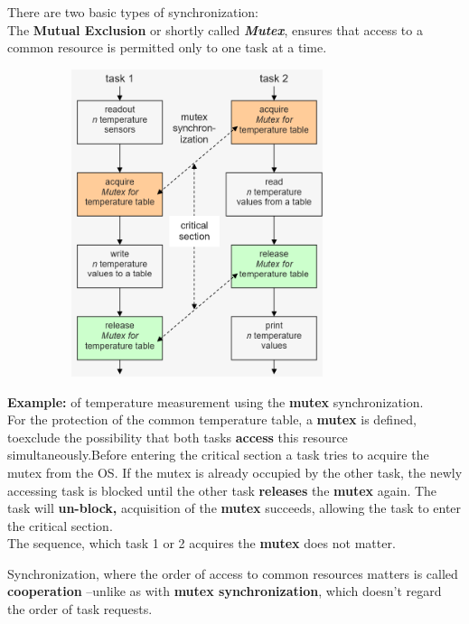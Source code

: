 \newpage  
There are two basic types of synchronization:\\

The \textbf{Mutual Exclusion }or shortly called \textbf{\textit{Mutex}}, ensures that access to a common resource is permitted only to one task at a time. 

 	\begin{figure}[h]
    \centering
    \includegraphics[width=9cm, height=9cm]{Images/image103.png}
    \label{fig:Fig }
    \end{figure}

\textbf{Example:} of temperature measurement using the \textbf{mutex} synchronization.\\

\textbf{ }For the protection of the common temperature table, a \textbf{mutex} is defined, toexclude the possibility that both tasks \textbf{access} this resource simultaneously.Before entering the critical section a task tries to acquire the mutex from the OS. If the mutex is already occupied by the other task, the newly accessing task is blocked\textbf{\textit{ }}until the other task \textbf{releases} the \textbf{mutex} again. The task will \textbf{un-block,} acquisition of the \textbf{mutex} succeeds, allowing the task to enter the critical section.\\

The sequence, which task 1 or 2 acquires the \textbf{mutex} does not matter.\\
\newpage

Synchronization, where the order of access to common resources matters is called \textbf{cooperation} --unlike as with\textbf{ mutex synchronization}, which doesn't regard the order of task requests.


